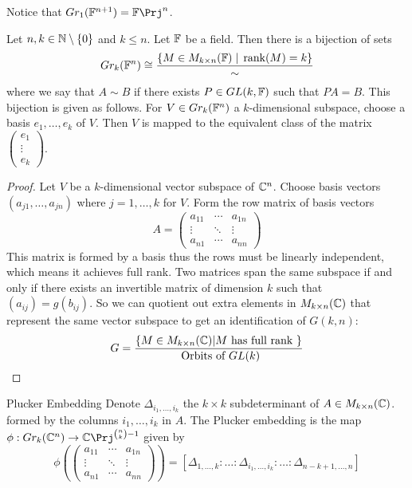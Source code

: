 \documentclass[a4paper]{article}
\begin{document}
Notice that $ Gr_1(\F^{n+1})=\F\Prj^n$. 

\begin{lmm}{}{} Let $n,k\in\mathbb{N}\setminus\{0\}$ and $k\leq n$. Let $\mathbb{F}$ be a field. Then there is a bijection of sets $$ Gr_k(\mathbb{F}^n)\cong\frac{\{M\in M_{k\times n}(\mathbb{F})\;|\;\rank(M)=k\}}{\sim}$$ where we say that $A\sim B$ if there exists $P\in GL(k,\mathbb{F})$ such that $PA=B$. This bijection is given as follows. For $V\in Gr_k(\mathbb{F}^n)$ a $k$-dimensional subspace, choose a basis $e_1,\dots,e_k$ of $V$. Then $V$ is mapped to the equivalent class of the matrix $\begin{pmatrix}
e_1\\\vdots\\e_k
\end{pmatrix}$. 
\begin{proof}
Let $V$ be a $k$-dimensional vector subspace of $\mathbb{C}^n$. Choose basis vectors $(a_{j1},\dots,a_{jn})$ where $j=1,\dots,k$ for $V$. Form the row matrix of basis vectors $$A=\begin{pmatrix}a_{11} & \cdots & a_{1n}\\\vdots & \ddots & \vdots\\ a_{n1} & \cdots & a_{nn}\end{pmatrix}$$
This matrix is formed by a basis thus the rows must be linearly independent, which means it achieves full rank. Two matrices span the same subspace if and only if there exists an invertible matrix of dimension $k$ such that $(a_{ij})=g(b_{ij})$. So we can quotient out extra elements in $M_{k\times n}(\mathbb{C})$ that represent the same vector subspace to get an identification of $G(k,n)$: $$G=\frac{\{M\in M_{k\times n}(\mathbb{C})|M\text{ has full rank }\}}{\text{ Orbits of }GL(k)}$$ 
\end{proof}
\end{lmm}

\begin{defn}{Plucker Embedding}{} Denote $\Delta_{i_1,\dots,i_k}$ the $k\times k$ subdeterminant of $A\in M_{k\times n}(\mathbb{C})$. formed by the columns $i_1,\dots,i_k$ in $A$. The Plucker embedding is the map $\phi: Gr_k(\C^n)\to\C\Prj^{\binom{n}{k}-1}$ given by $$\phi\left(\begin{pmatrix}a_{11} & \cdots & a_{1n}\\\vdots & \ddots & \vdots\\ a_{n1} & \cdots & a_{nn}\end{pmatrix}\right)=[\Delta_{1,\dots,k}:\dots:\Delta_{i_1,\dots,i_k}:\dots:\Delta_{n-k+1,\dots,n}]$$ 
\end{defn}
\end{document}
